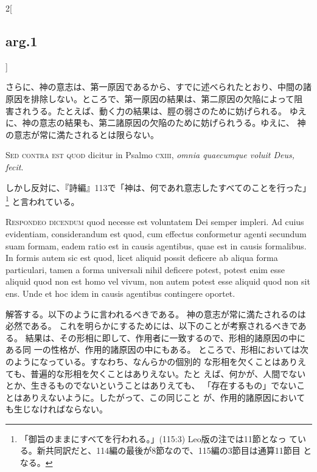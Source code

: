 \documentclass[paper=a4paper,fontsize=10pt,jafontsize=9pt,titlepage]{jlreq}
\begin{document}
\begin{paracol}{2}[\subsection{arg.1}]
\switchcolumn

さらに、神の意志は、第一原因であるから、すでに述べられたとおり、中間の諸
 原因を排除しない。ところで、第一原因の結果は、第二原因の欠陥によって阻
 害されうる。たとえば、動く力の結果は、脛の弱さのために妨げられる。
ゆえに、神の意志の結果も、第二諸原因の欠陥のために妨げられうる。ゆえに、
 神の意志が常に満たされるとは限らない。

\switchcolumn*[\subsection{s.c.}]


{\scshape  Sed contra est quod} dicitur in Psalmo {\scshape cxiii},
{\itshape omnia quaecumque voluit Deus, fecit}.

\switchcolumn

しかし反対に、『詩編』113で「神は、何であれ意志したすべてのことを行った」
 \footnote{「御旨のままにすべてを行われる。」(115:3) Leo版の注では11節となっ
 ている。新共同訳だと、114編の最後が8節なので、115編の3節目は通算11節目
 となる。}
 と言われている。



{\scshape Respondeo dicendum} quod necesse est voluntatem
Dei semper impleri. Ad cuius evidentiam, considerandum est quod, cum
effectus conformetur agenti secundum suam formam, eadem ratio est in
causis agentibus, quae est in causis formalibus. In formis autem sic est
quod, licet aliquid possit deficere ab aliqua forma particulari, tamen a
forma universali nihil deficere potest, potest enim esse aliquid quod
non est homo vel vivum, non autem potest esse aliquid quod non sit
ens. Unde et hoc idem in causis agentibus contingere oportet.

\switchcolumn

解答する。以下のように言われるべきである。
神の意志が常に満たされるのは必然である。
これを明らかにするためには、以下のことが考察されるべきである。
結果は、その形相に即して、作用者に一致するので、形相的諸原因の中にある同
 一の性格が、作用的諸原因の中にもある。
ところで、形相においては次のようになっている。すなわち、なんらかの個別的
 な形相を欠くことはありえても、普遍的な形相を欠くことはありえない。たと
 えば、何かが、人間でないとか、生きるものでないということはありえても、
 「存在するもの」でないことはありえないように。したがって、この同じこと
 が、作用的諸原因においても生じなければならない。


\end{paracol}
\end{document}
